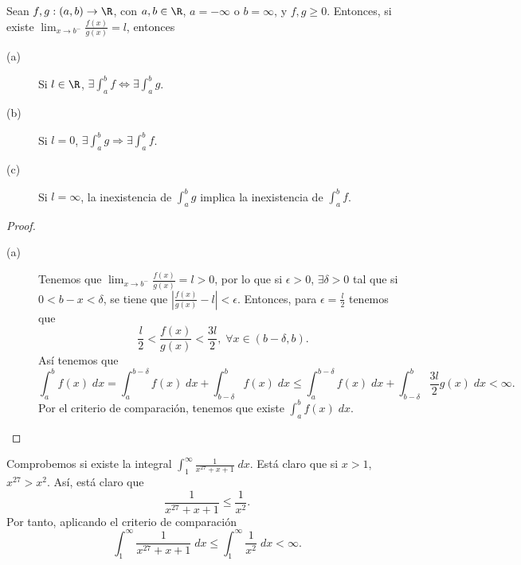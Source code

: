 \begin{ftheorem}
\normalfont Sean $\displaystyle f,g : (a,b) \to \R $, con $\displaystyle a,b \in \R $, $\displaystyle a = - \infty $ o $\displaystyle b = \infty $, y $\displaystyle f,g \geq 0 $. Entonces, si existe $\displaystyle \lim_{x \to b^{-}}\frac{f\left(x\right)}{g\left(x\right)} = l $, entonces
\begin{description}
\item[(a)] Si $\displaystyle l \in \R $, $\displaystyle \exists \int^{b}_{a} f \iff \exists \int^{b}_{a} g $. 
\item[(b)] Si $\displaystyle l = 0 $, $\displaystyle \exists \int^{b}_{a} g \Rightarrow \exists \int^{b}_{a} f  $. 
\item[(c)] Si $\displaystyle l = \infty $, la inexistencia de $\displaystyle \int^{b}_{a} g $ implica la inexistencia de $\displaystyle \int^{b}_{a} f $.
\end{description}
\end{ftheorem}
\begin{proof}
\begin{description}
\item[(a)] Tenemos que $\displaystyle \lim_{x \to b^{-}}\frac{f\left(x\right)}{g\left(x\right)} = l > 0 $, por lo que si $\displaystyle \epsilon > 0 $, $\displaystyle \exists \delta > 0 $ tal que si $\displaystyle 0 < b - x < \delta  $, se tiene que $\displaystyle \left|\frac{f\left(x\right)}{g\left(x\right)}-l\right|<\epsilon$. Entonces, para $\displaystyle \epsilon = \frac{l}{2} $ tenemos que
	\[ \frac{l}{2} < \frac{f\left(x\right)}{g\left(x\right)} < \frac{3l}{2}, \; \forall x \in \left(b-\delta, b\right) .\]
	Así tenemos que
	\[\int^{b}_{a} f\left(x\right) \; dx = \int^{b- \delta}_{a} f\left(x\right) \; dx + \int^{b}_{b-\delta } f\left(x\right) \; dx \leq \int^{b-\delta }_{a} f\left(x\right) \; dx + \int^{b}_{b-\delta } \frac{3l}{2}g\left(x\right) \; dx < \infty.\]
Por el criterio de comparación, tenemos que existe $\displaystyle \int^{b}_{a} f\left(x\right) \; dx $.	
\end{description}
\end{proof}
\begin{eg}
\normalfont Comprobemos si existe la integral $\displaystyle \int^{\infty}_{1} \frac{1}{x^{27}+x+1} \; dx $. Está claro que si $\displaystyle x > 1 $, $\displaystyle x^{27} > x^{2} $. Así, está claro que
\[ \frac{1}{x^{27}+x+1} \leq \frac{1}{x^{2}} .\]
Por tanto, aplicando el criterio de comparación
\[ \int^{\infty}_{1} \frac{1}{x^{27}+x+1} \; dx \leq \int^{\infty}_{1} \frac{1}{x^{2}} \; dx < \infty .\]
\end{eg}
